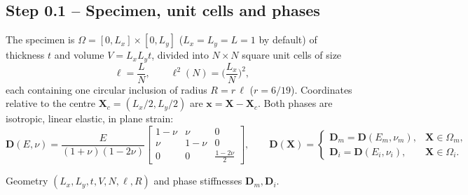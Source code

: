 \documentclass[11pt,a4paper]{article}
\newcommand{\Dm}{\mathbf{D}}                    %
\newcommand{\bx}{\bm{x}}
\newcommand{\bX}{\bm{X}}
\theoremstyle{plain}
\theoremstyle{remark}
\begin{document}
\subsection*{Step 0.1 -- Specimen, unit cells and phases}
The specimen is $\Omega=[0,L_x]\times[0,L_y]$ ($L_x=L_y=L=1$ by default) of thickness $t$ and
volume $V=L_xL_yt$, divided into $N\times N$ square unit cells of size
\begin{equation}
  \ell=\frac{L}{N},\qquad \ell^2(N)=\Big(\frac{L_x}{N}\Big)^2 ,
  \label{eq:ell}
\end{equation}
each containing one circular inclusion of radius $R=r\,\ell$ ($r=6/19$). Coordinates relative to
the centre $\bX_c=(L_x/2,L_y/2)$ are $\bx=\bX-\bX_c$. Both phases are isotropic, linear elastic,
in plane strain:
\begin{equation}
  \Dm(E,\nu)=\frac{E}{(1+\nu)(1-2\nu)}
  \begin{bmatrix}1-\nu&\nu&0\\ \nu&1-\nu&0\\ 0&0&\tfrac{1-2\nu}{2}\end{bmatrix},
  \qquad
  \Dm(\bX)=\begin{cases}\Dm_m=\Dm(E_m,\nu_m),&\bX\in\Omega_m,\\ \Dm_i=\Dm(E_i,\nu_i),&\bX\in\Omega_i.\end{cases}
  \label{eq:Dphase}
\end{equation}
\begin{delivers}
Geometry $(L_x,L_y,t,V,N,\ell,R)$ and phase stiffnesses $\Dm_m,\Dm_i$.
\end{delivers}
\end{document}
